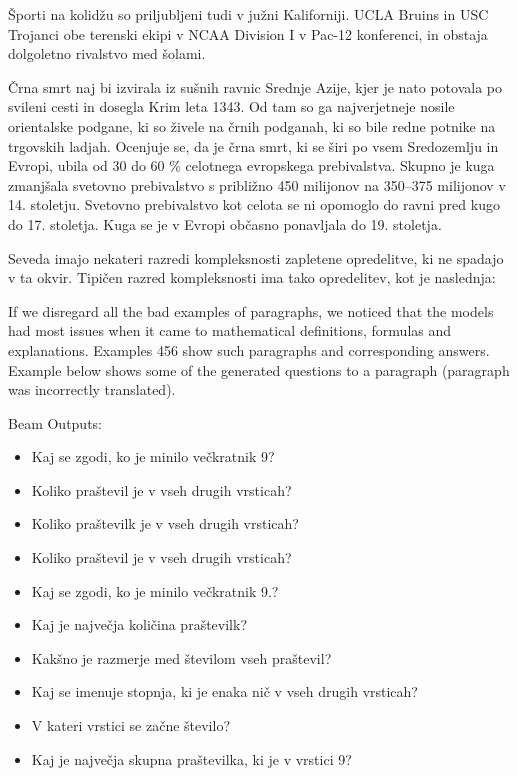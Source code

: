 \documentclass[fleqn,moreauthors,10pt]{ds_report}
\begin{document}
\begin{tcolorbox}[colback=lightgray,colframe=gray!75!black, title=Example 2, label=example:ex3]
Športi na kolidžu so priljubljeni tudi v južni Kaliforniji. UCLA Bruins in USC Trojanci obe terenski ekipi v NCAA Division I v Pac-12 konferenci, in obstaja dolgoletno rivalstvo med šolami.
\end{tcolorbox}
\begin{tcolorbox}[colback=lightgray,colframe=gray!75!black, title=Example 3, label=example:ex2]
Črna smrt naj bi izvirala iz sušnih ravnic Srednje Azije, kjer je nato potovala po svileni cesti in dosegla Krim leta 1343. Od tam so ga najverjetneje nosile orientalske podgane, ki so živele na črnih podganah, ki so bile redne potnike na trgovskih ladjah. Ocenjuje se, da je črna smrt, ki se širi po vsem Sredozemlju in Evropi, ubila od 30 do 60 \% celotnega evropskega prebivalstva. Skupno je kuga zmanjšala svetovno prebivalstvo s približno 450 milijonov na 350–375 milijonov v 14. stoletju. Svetovno prebivalstvo kot celota se ni opomoglo do ravni pred kugo do 17. stoletja. Kuga se je v Evropi občasno ponavljala do 19. stoletja.
\end{tcolorbox}


\begin{tcolorbox}[colback=lightgray,colframe=gray!75!black, title=Example 4, label=example:ex4]
Seveda imajo nekateri razredi kompleksnosti zapletene opredelitve, ki ne spadajo v ta okvir. Tipičen razred kompleksnosti ima tako opredelitev, kot je naslednja:
\end{tcolorbox}
If we disregard all the bad examples of paragraphs, we noticed that the models had most issues when it came to mathematical definitions, formulas and explanations. Examples 456 show such paragraphs and corresponding answers. Example below shows some of the generated questions to a paragraph (paragraph was incorrectly translated).

\begin{tcolorbox}[colback=lightgray,colframe=gray!75!black, title=Example 5, label=example:ex5]
Beam Outputs:
\begin{itemize}
    \item Kaj se zgodi, ko je minilo večkratnik 9?
    \item Koliko praštevil je v vseh drugih vrsticah?
    \item Koliko praštevilk je v vseh drugih vrsticah?
    \item Koliko praštevil je v vseh drugih vrsticah?
    \item Kaj se zgodi, ko je minilo večkratnik 9.?
    \item Kaj je največja količina praštevilk?
    \item Kakšno je razmerje med številom vseh praštevil?
    \item Kaj se imenuje stopnja, ki je enaka nič v vseh drugih vrsticah?
    \item V kateri vrstici se začne število?
    \item Kaj je največja skupna praštevilka, ki je v vrstici 9?
\end{itemize}

\end{tcolorbox}
\end{document}
